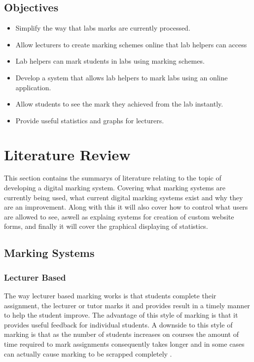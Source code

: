 \documentclass[12pt]{article}  %
\begin{document}
\subsection{Objectives}
\begin{itemize}
\item Simplify the way that labs marks are currently processed.
\item Allow lecturers to create marking schemes online that lab helpers can access
\item Lab helpers can mark students in labs using marking schemes.
\item Develop a system that allows lab helpers to mark labs using an online application.
\item Allow students to see the mark they achieved from the lab instantly.
\item Provide useful statistics and graphs for lecturers.
\end{itemize}








\newpage
\section{Literature Review}
This section contains the summarys of literature relating to the topic of developing a digital marking system. Covering what marking systems are currently being used, what current digital marking systems exist and why they are an improvement. Along with this it will also cover how to control what users are allowed to see, aswell as explaing systems for creation of custom website forms, and finally it will cover the graphical displaying of statistics.


\subsection{Marking Systems}

\subsubsection{Lecturer Based}
The way lecturer based marking works is that students complete their assignment, the lecturer or tutor marks it and provides result in a timely manner to help the student improve. The advantage of this style of marking is that it provides useful feedback for individual students.
A downside to this style of marking is that as the number of students increases on courses the amount of time required to mark assignments consequently takes longer and in some cases can actually cause marking to be scrapped completely \cite{brown_assessment_1999}. 
\end{document}
